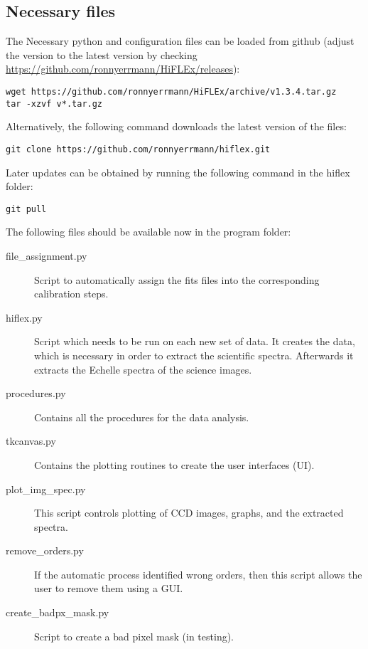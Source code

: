 \documentclass[10pt,a4paper]{article}
\begin{document}
\subsection{Necessary files}

\noindent The Necessary python and configuration files can be loaded from github (adjust the version to the latest version by checking \url{https://github.com/ronnyerrmann/HiFLEx/releases}):
\begin{lstlisting}[style=base]
wget https://github.com/ronnyerrmann/HiFLEx/archive/v1.3.4.tar.gz
tar -xzvf v*.tar.gz
\end{lstlisting}
Alternatively, the following command downloads the latest version of the files:
\begin{lstlisting}[style=base]
git clone https://github.com/ronnyerrmann/hiflex.git
\end{lstlisting}
Later updates can be obtained by running the following command in the hiflex folder:
\begin{lstlisting}[style=base]
git pull
\end{lstlisting}


\noindent The following files should be available now in the program folder:
\begin{description}
 \item[file\_assignment.py] Script to automatically assign the fits files into the corresponding calibration steps.
 \item[hiflex.py] Script which needs to be run on each new set of data. It creates the data, which is necessary in order to extract the scientific spectra. Afterwards it extracts the Echelle spectra of the science images.
 \item[procedures.py] Contains all the procedures for the data analysis.
 \item[tkcanvas.py] Contains the plotting routines to create the user interfaces (UI).
 \item[plot\_img\_spec.py] This script controls plotting of CCD images, graphs, and the extracted spectra.
 \item[remove\_orders.py] If the automatic process identified wrong orders, then this script allows the user to remove them using a GUI.
 \item[create\_badpx\_mask.py] Script to create a bad pixel mask (in testing).
\end{description}
\end{document}
